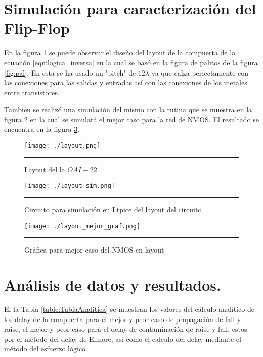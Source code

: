 \documentclass[12pt,a4paper]{article} %
\begin{document}
\section{Simulación para caracterización del Flip-Flop}

En la figura \ref{fig:layout} se puede observar el diseño del layout de la compuerta de la ecuación \ref{eqn:logica_inversa} en la cual se basó en la figura de palitos de la figura \ref{fig:pal}. En esta se ha usado un "pitch" de $12\lambda$ ya que calza perfectamente con las conexiones para las salidas y entradas así con las conexiones de los metales entre transistores.

También se realizó una simulación del mismo con la rutina que se muestra en la figura \ref{fig:layout_sim} en la cual se simulará el mejor caso para la red de NMOS. El resultado se encuentra en la figura \ref{fig:layout_graf}.

\begin{figure}[htbp]
\begin{center}
    \texttt{[image: ./layout.png]}
    \rule{35em}{0.5pt}
  \caption[Captura]{Layout del la $OAI-22$}
  \label{fig:layout}
  \end{center}
\end{figure}

\begin{figure}[htbp]
\begin{center}
    \texttt{[image: ./layout\_sim.png]}
    \rule{35em}{0.5pt}
  \caption[Captura]{Circuito para simulación en Ltpice del layout del circuito}
  \label{fig:layout_sim}
  \end{center}
\end{figure}

\begin{figure}[htbp]
\begin{center}
    \texttt{[image: ./layout\_mejor\_graf.png]}
    \rule{35em}{0.5pt}
  \caption[Captura]{Gráfica para mejor caso del NMOS en layout}
  \label{fig:layout_graf}
  \end{center}
\end{figure}

\section{Análisis de datos y resultados.}

El la Tabla \ref{table:TablaAnalitica} se muestran los valores del cálculo analítico de los delay de la compuerta para el mejor y peor caso de propagación de fall y raise, el mejor y peor caso para el delay de contaminación de raise y fall, estos por el método del delay de Elmore, así como el calculo del delay mediante el método del esfuerzo lógico.\\
\end{document}
